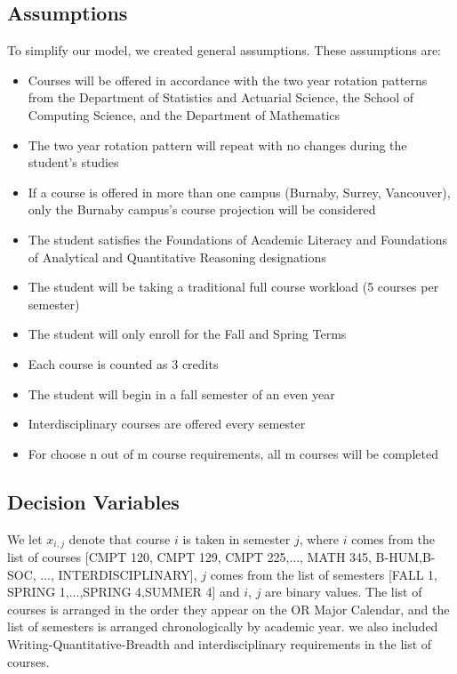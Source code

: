 \documentclass{article}
\begin{document}
\subsection{Assumptions}
To simplify our model, we created general assumptions. These assumptions are:
\begin{itemize}
    \item Courses will be offered in accordance with the two year rotation patterns from the Department of Statistics and Actuarial Science, the School of Computing Science, and the Department of Mathematics
    \item The two year rotation pattern will repeat with no changes during the student's studies
    \item If a course is offered in more than one campus (Burnaby, Surrey, Vancouver), only the Burnaby campus's course projection will be considered 
    \item The student satisfies the Foundations of Academic Literacy and Foundations of Analytical and Quantitative Reasoning designations
    \item The student will be taking a traditional full course workload (5 courses per semester)
    \item The student will only enroll for the Fall and Spring Terms
    \item Each course is counted as 3 credits
    \item The student will begin in a fall semester of an even year
    \item Interdisciplinary courses are offered every semester
    \item For choose n out of m course requirements, all m courses will be completed
\end{itemize}



\subsection{Decision Variables}
We let $x_{i,j}$ denote that course $i$ is taken in semester $j$, where $i$ comes from the list of courses [CMPT 120, CMPT 129, CMPT 225,..., MATH 345, B-HUM,B-SOC, ..., INTERDISCIPLINARY], $j$ comes from the list of semesters [FALL 1, SPRING 1,...,SPRING 4,SUMMER 4] and $i$, $j$ are binary values. The list of courses is arranged in the order they appear on the OR Major Calendar, and the list of semesters is arranged chronologically by academic year. we also included Writing-Quantitative-Breadth and interdisciplinary requirements in the list of courses.
\end{document}
